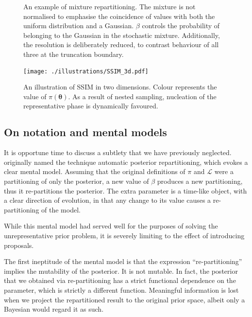 \documentclass[draft,usenatbib]{mnras}
\begin{document}
\begin{figure}





\caption{An example of mixture repartitioning. The mixture is not
normalised to emphasise the coincidence of values with both the
uniform distribution and a Gaussian. $\beta$ controls the
probability of belonging to the Gaussian in the stochastic
mixture.  Additionally, the resolution is deliberately reduced, to
contrast behaviour of all three at the truncation
boundary. \label{fig:mixture}}
\end{figure}

\begin{figure}
\centering
\texttt{[image: ./illustrations/SSIM\_3d.pdf]}
\caption{An illustration of SSIM in two dimensions. Colour represents the value of $\pi(\bm{\theta})$. As a result of nested sampling, nucleation of the representative phase is dynamically favoured.}
\label{fig:mixture-3d}
\end{figure}

\subsection{On notation and mental models}
\label{sec:org9e7115b}

It is opportune time to discuss a subtlety that we have previously
neglected. \cite{chen-ferroz-hobson} originally named the technique
automatic posterior repartitioning, which evokes a clear mental
model. Assuming that the original definitions of \(\pi\) and
\(\mathcal{L}\) were a partitioning of only the posterior, a new value
of \(\beta\) produces a new partitioning, thus it re-partitions the
posterior.  The extra parameter is a time-like object, with a clear
direction of evolution, in that any change to its value causes a
re-partitioning of the model.

While this mental model had served well for the purposes of solving
the unrepresentative prior problem, it is severely limiting to the
effect of introducing proposals.

The first ineptitude of the mental model is that the expression
``re-partitioning'' implies the mutability of the posterior. It is not
mutable. In fact, the posterior that we obtained via re-partitioning
has a strict functional dependence on the parameter, which is strictly
a different function. Meaningful information is lost when we project
the repartitioned result to the original prior space, albeit only a
Bayesian would regard it as such.
\end{document}
